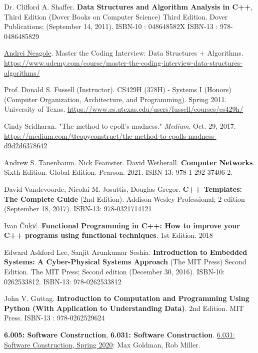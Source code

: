 \documentclass[10pt]{amsart}
\begin{document}
\begin{thebibliography}{9}
Dr. Clifford A. Shaffer. \textbf{Data Structures and Algorithm Analysis in C++}, Third Edition (Dover Books on Computer Science) Third Edition. Dover Publications; (September 14, 2011). ISBN-10 : 048648582X ISBN-13 : 978-0486485829 


\href{https://www.udemy.com/course/master-the-coding-interview-data-structures-algorithms/#instructor-1}{Andrei Neagole}. Master the Coding Interview: Data Structures $+$ Algorithms. 
\url{https://www.udemy.com/course/master-the-coding-interview-data-structures-algorithms/}

Prof. Donald S. Fussell (Instructor). CS429H (378H) - Systems I (Honors) (Computer Organization, Architecture, and Programming). Spring 2011. University of Texas. \url{https://www.cs.utexas.edu/users/fussell/courses/cs429h/}

 Cindy Sridharan. "The method to epoll's madness." \emph{Medium}. Oct. 29, 2017. \url{https://medium.com/@copyconstruct/the-method-to-epolls-madness-d9d2d6378642}

Andrew S. Tanenbaum. Nick Feamster. David Wetherall. \textbf{Computer Networks}. Sixth Edition. Global Edition. Pearson. 2021. ISBN 13: 978-1-292-37406-2.

David Vandevoorde, Nicolai M. Josuttis, Douglas Gregor. \textbf{C++ Templates: The Complete Guide} (2nd Edition). Addison-Wesley Professional; 2 edition (September 18, 2017). ISBN-13: 978-0321714121

Ivan \v{C}uki\'{c}. \textbf{Functional Programming in C++: How to improve your C++ programs using functional techniques}. 1st Edition. 2018


Edward Ashford Lee, Sanjit Arunkumar Seshia. \textbf{Introduction to Embedded Systems: A Cyber-Physical Systems Approach} (The MIT Press) Second Edition. The MIT Press; Second edition (December 30, 2016). ISBN-10: 0262533812. ISBN-13: 978-0262533812

John V. Guttag. \textbf{Introduction to Computation and Programming Using Python (With Application to Understanding Data)}. 2nd Edition. 	MIT Press.  ISBN-13 : 978-0262529624 

\textbf{6.005: Software Construction}, \textbf{6.031: Software Construction}. \href{http://web.mit.edu/6.031/www/sp20/}{6.031: Software Construction, Spring 2020}: Max Goldman, Rob Miller.



\end{thebibliography}
\end{document}
